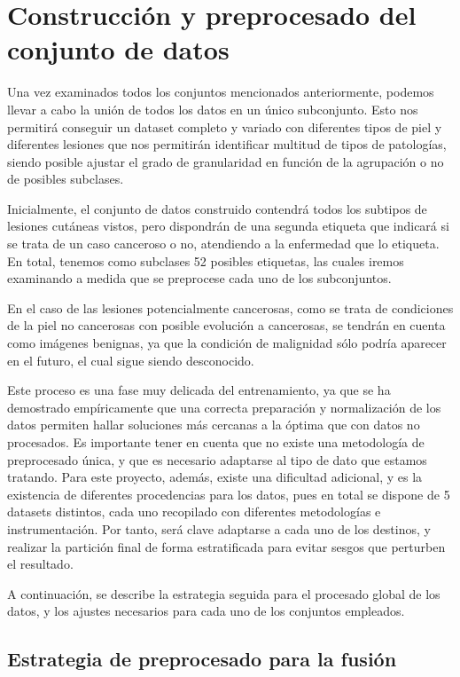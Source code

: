 \chapter{Construcción y preprocesado del conjunto de datos}

Una vez examinados todos los conjuntos mencionados anteriormente, podemos llevar a cabo la unión de todos los datos en un único subconjunto. Esto nos permitirá conseguir un dataset completo y variado con diferentes tipos de piel y diferentes lesiones que nos permitirán identificar multitud de tipos de patologías, siendo posible ajustar el grado de granularidad en función de la agrupación o no de posibles subclases.

Inicialmente, el conjunto de datos construido contendrá todos los subtipos de lesiones cutáneas vistos, pero dispondrán de una segunda etiqueta que indicará si se trata de un caso canceroso o no, atendiendo a la enfermedad que lo etiqueta. En total, tenemos como subclases 52 posibles etiquetas, las cuales iremos examinando a medida que se preprocese cada uno de los subconjuntos.

En el caso de las lesiones potencialmente cancerosas, como se trata de condiciones de la piel no cancerosas con posible evolución a cancerosas, se tendrán en cuenta como imágenes benignas, ya que la condición de malignidad sólo podría aparecer en el futuro, el cual sigue siendo desconocido.

Este proceso es una fase muy delicada del entrenamiento, ya que se ha demostrado empíricamente que una correcta preparación y normalización de los datos permiten hallar soluciones más cercanas a la óptima que con datos no procesados. Es importante tener en cuenta que no existe una metodología de preprocesado única, y que es necesario adaptarse al tipo de dato que estamos tratando. Para este proyecto, además, existe una dificultad adicional, y es la existencia de diferentes procedencias para los datos, pues en total se dispone de 5 datasets distintos, cada uno recopilado con diferentes metodologías e instrumentación. Por tanto, será clave adaptarse a cada uno de los destinos, y realizar la partición final de forma estratificada para evitar sesgos que perturben el resultado.

A continuación, se describe la estrategia seguida para el procesado global de los datos, y los ajustes necesarios para cada uno de los conjuntos empleados.

\section{Estrategia de preprocesado para la fusión}

